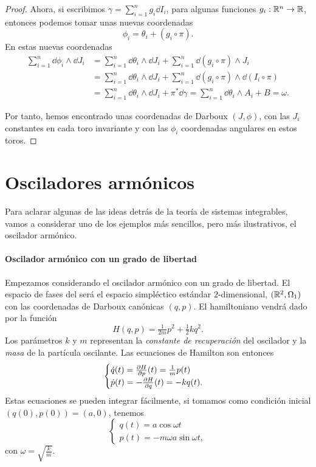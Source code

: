 \begin{proof}
Ahora, si escribimos $\gamma= \sum_{i=1}^n g_i \dd I_i$, para algunas funciones $g_i:\mathbb{R}^n \rightarrow \mathbb{R}$, entonces podemos tomar unas nuevas coordenadas 
\[
  \phi_i= \theta_i + (g_i \circ \pi).
\]
En estas nuevas coordenadas
\[
\begin{split}
  \sum_{i=1}^n \dd \phi_i \wedge \dd J_i & = \sum_{i=1}^n \dd \theta_i \wedge \dd J_i + \sum_{i=1}^n \dd(g_i \circ \pi) \wedge J_i \\
   & =\sum_{i=1}^n \dd \theta_i \wedge \dd J_i + \sum_{i=1}^n \dd(g_i \circ \pi) \wedge \dd (I_i \circ \pi) \\
   & =\sum_{i=1}^n \dd \theta_i \wedge \dd J_i + \pi^* \dd \gamma = \sum_{i=1}^n \dd \theta_i \wedge A_i + B = \omega.
\end{split}
\]

Por tanto, hemos encontrado unas coordenadas de Darboux $(J,\phi)$, con las $J_i$ constantes en cada toro invariante y con las $\phi_i$ coordenadas angulares en estos toros. 
\end{proof}

\section{Osciladores armónicos}
Para aclarar algunas de las ideas detrás de la teoría de sistemas integrables, vamos a considerar uno de los ejemplos más sencillos, pero más ilustrativos, el oscilador armónico.

\paragraph{\bf Oscilador armónico con un grado de libertad}\mbox{}

  Empezamos considerando el oscilador armónico con un grado de libertad. El espacio de fases del será el espacio simpléctico estándar $2$-dimensional, $(\mathbb{R}^2,\Omega_1)$ con las coordenadas de Darboux canónicas $(q,p)$. El hamiltoniano vendrá dado por la función
  \begin{equation*}
    H(q,p)=\tfrac{1}{2m}p^2+\tfrac{1}{2}kq^2.
  \end{equation*}
  Los parámetros $k$ y $m$ representan la \emph{constante de recuperación} del oscilador y la \emph{masa} de la partícula oscilante.
  Las ecuaciones de Hamilton son entonces
  \begin{equation*}
    \begin{cases}
      \dot q(t) = \frac{\partial H}{\partial p}(t)=\tfrac{1}{m}p(t)\\
    \dot p(t) = -\frac{\partial H}{\partial q}(t)=-kq(t).
  \end{cases}
  \end{equation*}
  Estas ecuaciones se pueden integrar fácilmente, si tomamos como condición inicial $(q(0),p(0))=(a,0)$, tenemos
  \begin{equation*}
    \begin{cases}
   q(t)=a\cos\omega t \\ 
   p(t)=-m\omega a\sin\omega t,
 \end{cases}
  \end{equation*}
  con $\omega=\sqrt{\frac{k}{m}}$.
  
